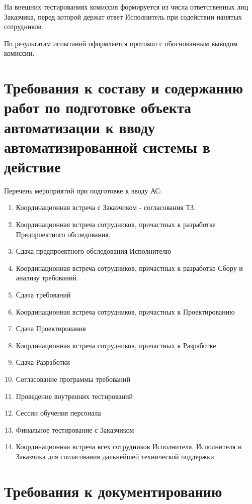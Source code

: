 \documentclass[16pt,a4paper]{article}
\begin{document}
На внешних тестированиях комиссия формируется из числа ответственных лиц Заказчика, перед которой держат ответ Исполнитель при содействии нанятых сотрудников.

По результатам испытаний оформляется протокол с обоснованным выводом комиссии.
\section{Требования к составу и содержанию работ по подготовке объекта автоматизации к вводу автоматизированной системы в действие}
Перечень мероприятий при подготовке к вводу АС:
\begin{enumerate}
    \item Координационная встреча с Заказчиком - согласования ТЗ.
    \item Координационная встреча сотрудников, причастных к разработке Предпроектного обследования.
    \item Сдача предпроектного обследования Исполнителю
    \item Координационная встреча сотрудников, причастных к разработке Сбору и анализу требований.
    \item Сдача требований
    \item Координационная встреча сотрудников, причастных к Проектированию
    \item Сдача Проектирования
    \item Координационная встреча сотрудников, причастных к Разработке
    \item Сдача Разработки
    \item Согласование программы требований
    \item Проведение внутренних тестирований
    \item Сессии обучения персонала
    \item Финальное тестирование с Заказчиком
    \item Координационная встреча всех сотрудников Исполнителя, Исполнителя и Заказчика для согласования дальнейшей технической поддержки
\end{enumerate}
\section{Требования к документированию}
\end{document}
